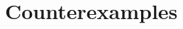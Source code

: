 \documentclass{amsart}
\renewcommand{\AA}{\mathscr A}
\begin{document}
\section{Counterexamples}



\end{document}
